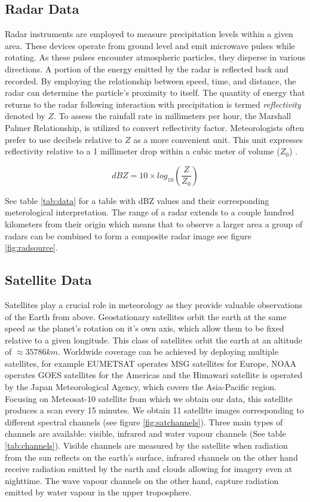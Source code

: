 \subsection{Radar Data}
Radar instruments are employed to measure precipitation levels within a given area.
These devices operate from ground level and emit microwave pulses while rotating.
As these pulses encounter atmospheric particles, they disperse in various directions.
A portion of the energy emitted by the radar is reflected back and recorded.
By employing the relationship between speed, time, and distance, the radar can determine the particle's proximity to itself.
The quantity of energy that returns to the radar following interaction with precipitation is termed \textit{reflectivity} denoted by $Z$.
To assess the rainfall rate in millimeters per hour, the Marshall Palmer Relationship, \cite{marshall-1948} is utilized to convert reflectivity factor.
Meteorologists often prefer to use decibels relative to $Z$ as a more convenient unit.
This unit expresses reflectivity relative to a 1 millimeter drop within a cubic meter of volume ($Z_0$) \cite{rogers-1976}.

\begin{equation}
  dBZ = 10 \times log_{10}(\frac{Z}{Z_0})
\end{equation}

See table \ref{tab:data} for a table with dBZ values and their corresponding meterological interpretation.
The range of a radar extends to a couple hundred kilometers from their origin which means that to observe a larger area a group of radars
can be combined to form a composite radar image see figure \ref{fig:radsource}. 


\subsection{Satellite Data}
Satellites play a crucial role in meteorology as they provide valuable observations of the Earth from above.
Geostationary satellites orbit the earth at the same speed as the planet's rotation on it's own axis, which allow them to be fixed relative to a given longitude.
This class of satellites orbit the earth at an altitude of $\approx 35786 km$.
Worldwide coverage can be achieved by deploying multiple satellites, for example EUMETSAT operates MSG satellites for Europe, NOAA operates GOES satellites for the Americas and the Himawari satellite is operated by the Japan Meteorological Agency, which covers the Asia-Pacific region.
Focusing on Meteosat-10 satellite from which we obtain our data, this satellite produces a scan every 15 minutes.
We obtain 11 satellite images corresponding to different spectral channels (see figure \ref{fig:satchannels}). Three main types of channels are available: visible, infrared and water vapour channels (See table \ref{tab:channels}). 
Visible channels are measured by the satellite when radiation from the sun reflects on the earth's surface, infrared channels on the other hand receive radiation emitted by the earth and clouds allowing for imagery even at nighttime. The wave vapour channels on the other hand, capture radiation emitted
by water vapour in the upper troposphere.
